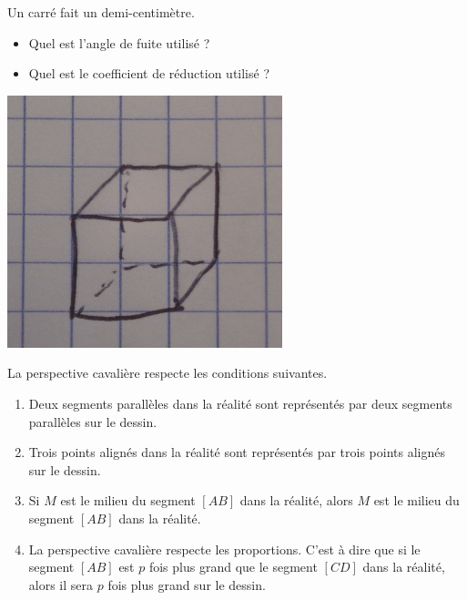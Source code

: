 \begin{minipage}{0.485\textwidth}
    Un carré fait un demi-centimètre. 
    \begin{itemize}
        \item Quel est l'angle de fuite utilisé ?
        \item Quel est le coefficient de réduction utilisé ?
    \end{itemize}
\end{minipage}
\hspace{1mm}
\begin{minipage}{0.6\textwidth}
    \center
    \includegraphics[width=0.6\textwidth]{cube_quadrill.png}
\end{minipage}

\begin{propriete}
    La perspective cavalière respecte les conditions suivantes.
    \begin{enumerate}
        \item
             Deux segments parallèles dans la réalité sont représentés par deux segments parallèles sur le dessin.
         \item
             Trois points alignés dans la réalité sont représentés par trois points alignés sur le dessin.
         \item
             Si \( M\) est le milieu du segment \( [AB]\) dans la réalité, alors \( M\) est le milieu du segment \( [AB]\) dans la réalité.
         \item
             La perspective cavalière respecte les proportions. C'est à dire que si le segment \( [AB]\) est \( p\) fois plus grand que le segment \( [CD]\) dans la réalité, alors il sera \( p\) fois plus grand sur le dessin.
    \end{enumerate}
\end{propriete}

